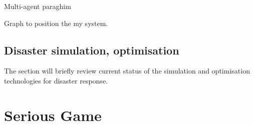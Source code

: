 Multi-agent paraghim 


Graph to position the my system. 

\subsection{Disaster simulation, optimisation}
The section will briefly review current status of the simulation and optimisation technologies for disaster response.


\section{Serious Game}








